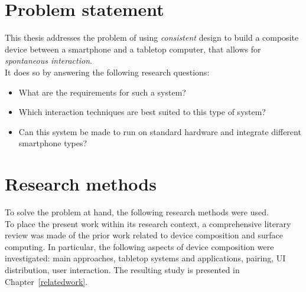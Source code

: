 %
%
%
%
%
%
%
%
%
%

\section{Problem statement}

This thesis addresses the problem of using \emph{consistent} design to build a composite device between a smartphone and a tabletop computer, that allows for \emph{spontaneous interaction}.
\\
\linebreak
It does so by answering the following research questions:
\begin{itemize}
\item What are the requirements for such a system?
\item Which interaction techniques are best suited to this type of system?
\item Can this system be made to run on standard hardware and integrate different smartphone types?
\end{itemize}

\section{Research methods}

To solve the problem at hand, the following research methods were used.
\\
\linebreak
To place the present work within its research context, 
a comprehensive literary review was made of the prior work related to device composition and surface computing.
In particular, the following aspects of device composition were investigated: main approaches, tabletop systems and applications, pairing, UI distribution, user interaction.
The resulting study is presented in Chapter~\ref{relatedwork}.

